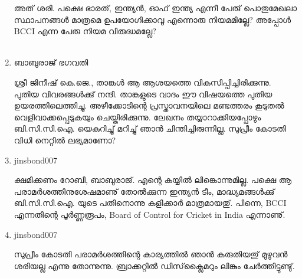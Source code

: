 \begin{enumerate}
അത് ശരി. പക്ഷെ ഭാരത്, ഇന്ത്യന്‍, ഓഫ് ഇന്ത്യ എന്നീ പേരു് പൊതുമേഖലാ സ്ഥാപനങ്ങള്‍ മാത്രമെ ഉപയോഗിക്കാവൂ 
എന്നൊരു നിയമമില്ലേ? അപ്പോള്‍ BCCI എന്ന പേരു നിയമ വിരുദ്ധമല്ലേ?
\\
\\
 \item{ബാബുരാജ് ഭഗവതി}

ശ്രീ ജിനീഷ് കെ.ജെ., താങ്കള്‍ ആ ആശയത്തെ വികസിപ്പിച്ചിരിക്കുന്നു. പുതിയ വിവരങ്ങള്‍ക്കു് നന്ദി. താങ്കളുടെ വാദം ഈ 
വിഷയത്തെ പുതിയ ഉയരത്തിലെത്തിച്ചു. അഴീക്കോടിന്റെ പ്രസ്താവനയിലെ മണ്ടത്തരം കൂടുതല്‍ വെളിവാക്കപ്പെടുകയും 
ചെയ്തിരിക്കുന്നു. ലേഖനം തയ്യാറാക്കിയപ്പോഴും ബി.സി.സി.ഐ. യെകുറിച്ചു് മറിച്ചു് ഞാന്‍ ചിന്തിച്ചിരുന്നില്ല. സുപ്രീം കോടതി വിധി 
നെറ്റില്‍ ലഭ്യമാണോ?

 \item{jinsbond007}

ക്ഷമിക്കണം റോബി, ബാബുരാജ്. എന്റെ കയ്യില്‍ ലിങ്കൊന്നുമില്ല. പക്ഷെ ആ പരാമര്‍ശത്തിനുശേഷമാണു് തോല്‍ക്കുന്ന ഇന്ത്യന്‍ ടീം, 
മാദ്ധ്യമങ്ങള്‍ക്കു് ബി.സി.സി.ഐ. യുടെ പതിനൊന്നു കളിക്കാര്‍ മാത്രമായതു്. പിന്നെ, BCCI എന്നതിന്റെ പൂര്‍ണ്ണരൂപം, 
Board of Control for Cricket in India എന്നാണു്.

 \item{jinsbond007}

സുപ്രീം കോടതി പരാമര്‍ശത്തിന്റെ കാര്യത്തില്‍ ഞാന്‍ കരുതിയതു് മുഴുവന്‍ ശരിയല്ല എന്നു തോന്നുന്നു. ബ്രാക്കറ്റില്‍ 
ഡിസ്‌ക്ലൈമറും ലിങ്കും ചേര്‍ത്തിട്ടുണ്ടു്.
    
\end{enumerate}

\newpage
